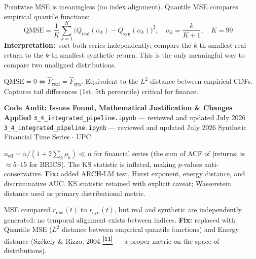 \documentclass[10pt]{article}
\newcommand{\amberbox}[2]{\begin{tcolorbox}[mybox={Amber}{ABg},title={#1}]#2\end{tcolorbox}}
\newcommand{\pagehead}[2]{%
  \begin{tcolorbox}[enhanced,arc=0pt,outer arc=0pt,boxrule=0pt,
    colback=Navy,colframe=Navy,
    top=5pt,bottom=5pt,left=8pt,right=8pt,
    before skip=0pt,after skip=10pt]
  {\color{white}\large\bfseries #1}%
  \ifx\relax#2\relax\else\\[1pt]{\color{blue!30!white}\small #2}\fi
  \hfill{\color{blue!20!white}\footnotesize Synthetic Financial Time Series $\cdot$ UPC}
  \end{tcolorbox}}
\newcommand{\tcite}[1]{%
  \hyperlink{R:#1}{\textsuperscript{\scriptsize\textbf{[#1]}}}}
\begin{document}
\begin{multicols}{2}
\amberbox{5.\ Quantile MSE --- Proper Distribution Shape Comparison}{%
Pointwise MSE is meaningless (no index alignment). Quantile MSE compares empirical quantile functions:
\begin{equation*}
  \text{QMSE} = \frac{1}{K}\sum_{k=1}^K
    \bigl(Q_\text{real}(\alpha_k) - Q_\text{syn}(\alpha_k)\bigr)^2,
  \quad \alpha_k = \frac{k}{K+1},\quad K = 99
\end{equation*}
\textbf{Interpretation:}\ sort both series independently; compare the $k$-th smallest real return to the $k$-th smallest synthetic return. This is the only meaningful way to compare two unaligned distributions.

$\text{QMSE} = 0 \Leftrightarrow \hat{F}_\text{real} = \hat{F}_\text{syn}$. Equivalent to the $L^2$ distance between empirical CDFs. Captures tail differences (1st, 5th percentile) critical for finance.}

\end{multicols}

\clearpage

\pagehead{Code Audit: Issues Found, Mathematical Justification \& Changes Applied}
         {\texttt{3\_4\_integrated\_pipeline.ipynb} --- reviewed and updated July 2026}

\vspace{4pt}
\newcommand{\auditrow}[5]{%
  \begin{tcolorbox}[mybox={#2}{#3},
    title={\textbf{[#1]}\quad #4},
    before skip=4pt, after skip=4pt, breakable]
  \small #5
  \end{tcolorbox}}

\auditrow{FIXED}{DRed}{RBg}%
  {KS / Welch tests assumed i.i.d.\ --- CRITICAL}%
  {$n_\text{eff} = n/(1+2\sum_k\rho_k) \ll n$ for financial series (the sum of ACF of $|\text{returns}|$ is $\approx 5$--$15$ for BRICS). The KS statistic is inflated, making $p$-values anti-conservative. \textbf{Fix:} added ARCH-LM test, Hurst exponent, energy distance, and discriminative AUC. KS statistic retained with explicit caveat; Wasserstein distance used as primary distributional metric.}

\auditrow{FIXED}{DRed}{RBg}%
  {Pointwise MSE/MAE had no semantic meaning}%
  {MSE compared $r_\text{real}(t)$ to $r_\text{syn}(t)$, but real and synthetic are independently generated: no temporal alignment exists between indices. \textbf{Fix:} replaced with Quantile MSE ($L^2$ distance between empirical quantile functions) and Energy distance (Sz\'{e}kely \& Rizzo, 2004\tcite{11} --- a proper metric on the space of distributions).}
\end{document}
